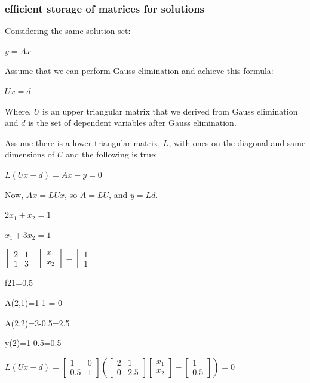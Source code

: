 \documentclass[11pt]{article}
\begin{document}
\subsubsection{efficient storage of matrices for
solutions}\label{efficient-storage-of-matrices-for-solutions}

Considering the same solution set:

\(y=Ax\)

Assume that we can perform Gauss elimination and achieve this formula:

\(Ux=d\)

Where, \(U\) is an upper triangular matrix that we derived from Gauss
elimination and \(d\) is the set of dependent variables after Gauss
elimination.

Assume there is a lower triangular matrix, \(L\), with ones on the
diagonal and same dimensions of \(U\) and the following is true:

\(L(Ux-d)=Ax-y=0\)

Now, \(Ax=LUx\), so \(A=LU\), and \(y=Ld\).

\(2x_{1}+x_{2}=1\)

\(x_{1}+3x_{2}=1\)

\(\left[ \begin{array}{cc} 2 & 1 \\ 1 & 3 \end{array} \right] \left[\begin{array}{c} x_{1} \\ x_{2} \end{array}\right]= \left[\begin{array}{c} 1 \\ 1\end{array}\right]\)

f21=0.5

A(2,1)=1-1 = 0

A(2,2)=3-0.5=2.5

y(2)=1-0.5=0.5

\(L(Ux-d)= \left[ \begin{array}{cc} 1 & 0 \\ 0.5 & 1 \end{array} \right] \left(\left[ \begin{array}{cc} 2 & 1 \\ 0 & 2.5 \end{array} \right] \left[\begin{array}{c} x_{1} \\ x_{2} \end{array}\right]- \left[\begin{array}{c} 1 \\ 0.5\end{array}\right]\right)=0\)
\end{document}

